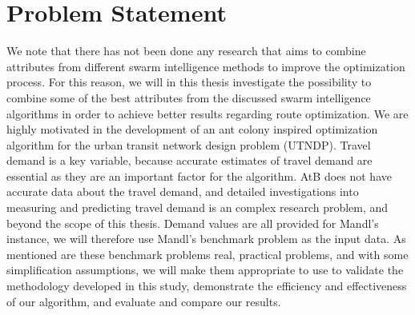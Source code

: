 \section{Problem Statement} 

We note that there has not been done any research that aims to combine attributes from different swarm intelligence methods to improve the optimization process. For this reason, we will in this thesis investigate the possibility to combine some of the best attributes from the discussed swarm intelligence algorithms in order to achieve better results regarding route optimization. We are highly motivated in the development of an ant colony inspired optimization algorithm for the urban transit network design problem (UTNDP). Travel demand is a key variable, because accurate estimates of travel demand are essential as they are an important factor for the algorithm. AtB does not have accurate data about the travel demand, and detailed investigations into measuring and predicting travel demand is an complex research problem, and beyond the scope of this thesis. Demand values are all provided for Mandl's instance, we will therefore use Mandl's benchmark problem \citep{mandl79} as the input data. %
As mentioned are these benchmark problems real, practical problems, and with some simplification assumptions, we will make them appropriate to use to validate the methodology developed in this study, demonstrate the efficiency and effectiveness of our algorithm, and evaluate and compare our results. 

